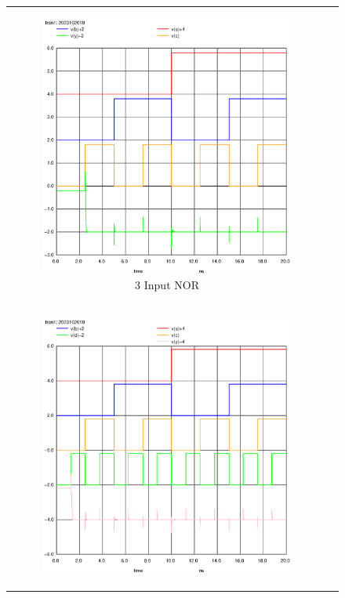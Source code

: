 \documentclass[conference]{IEEEtran}
\begin{document}
\begin{figure}[H]
\begin{tabular}{cc}
\begin{subfigure}{0.44\linewidth}
            \includegraphics[width=\textwidth]{images/nor_3_cmos_post_tran.eps}
            \caption{3 Input NOR}
        \end{subfigure} \\
        \begin{subfigure}{0.44\linewidth}
            \centering
            \includegraphics[width=\textwidth]{images/nor_4_cmos_post_tran.eps}

\end{subfigure}
\end{tabular}
\end{figure}
\end{document}
